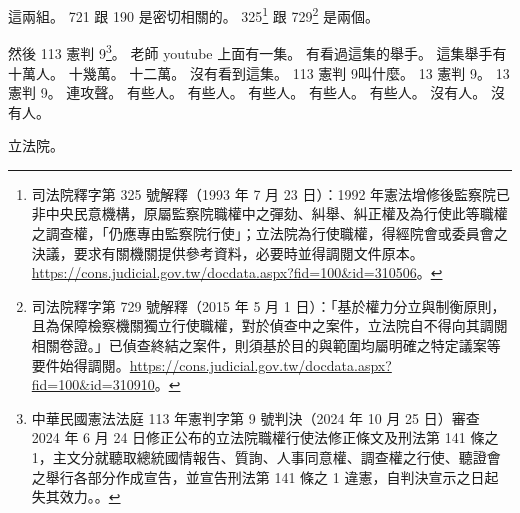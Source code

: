 \hypertarget{c01:cue:1558}{}這兩組。
\hypertarget{c01:cue:1559}{}721 跟 190 是密切相關的。
\hypertarget{c01:cue:1560}{}325\footnote{司法院釋字第 325 號解釋（1993 年 7 月 23 日）：1992 年憲法增修後監察院已非中央民意機構，原屬監察院職權中之彈劾、糾舉、糾正權及為行使此等職權之調查權，「仍應專由監察院行使」；立法院為行使職權，得經院會或委員會之決議，要求有關機關提供參考資料，必要時並得調閱文件原本。\url{https://cons.judicial.gov.tw/docdata.aspx?fid=100&id=310506}。} 跟 729\footnote{司法院釋字第 729 號解釋（2015 年 5 月 1 日）：「基於權力分立與制衡原則，且為保障檢察機關獨立行使職權，對於偵查中之案件，立法院自不得向其調閱相關卷證。」已偵查終結之案件，則須基於目的與範圍均屬明確之特定議案等要件始得調閱。\url{https://cons.judicial.gov.tw/docdata.aspx?fid=100&id=310910}。} 是兩個。

\hypertarget{c01:cue:1561}{}然後 113 憲判 9\footnote{中華民國憲法法庭 113 年憲判字第 9 號判決（2024 年 10 月 25 日）審查 2024 年 6 月 24 日修正公布的立法院職權行使法修正條文及刑法第 141 條之 1，主文分就聽取總統國情報告、質詢、人事同意權、調查權之行使、聽證會之舉行各部分作成宣告，並宣告刑法第 141 條之 1 違憲，自判決宣示之日起失其效力。\cite{ccj113-9}。}。
\hypertarget{c01:cue:1562}{}老師 youtube 上面有一集。
\hypertarget{c01:cue:1563}{}有看過這集的舉手。
\hypertarget{c01:cue:1564}{}這集舉手有十萬人。
\hypertarget{c01:cue:1565}{}十幾萬。
\hypertarget{c01:cue:1566}{}十二萬。
\hypertarget{c01:cue:1567}{}沒有看到這集。
\hypertarget{c01:cue:1568}{}113 憲判 9叫什麼。
\hypertarget{c01:cue:1569}{}13 憲判 9。
\hypertarget{c01:cue:1570}{}13 憲判 9。
\hypertarget{c01:cue:1571}{}連攻聲。
\hypertarget{c01:cue:1572}{}有些人。
\hypertarget{c01:cue:1573}{}有些人。
\hypertarget{c01:cue:1574}{}有些人。
\hypertarget{c01:cue:1575}{}有些人。
\hypertarget{c01:cue:1576}{}有些人。
\hypertarget{c01:cue:1577}{}沒有人。
\hypertarget{c01:cue:1578}{}沒有人。

\hypertarget{c01:cue:1579}{}立法院。

